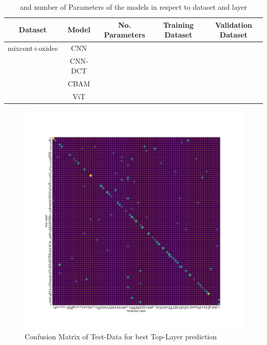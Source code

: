 \begin{table}[H]
    \centering
    \begin{tabular}{c|c|c|c|c}
        Dataset & Model   & No. Parameters & Training Dataset    & Validation Dataset    \\
        \hline
 mixcont+oxides& CNN     &                &                       &                         \\
               & CNN-DCT &                &                       &                         \\
               & CBAM    &                &                       &                         \\
               & ViT     &                &                       &                         \\

    \end{tabular}
    \caption{ and number of Parameters of the models in respect to dataset and layer}
    \label{tab:acc_depth}
\end{table}




\begin{center}
\begin{figure}
        \centerline{\includegraphics[width=1.4\textwidth]{Figures/best_task_1_model_CM.png}}
    \centering
    \caption{Confusion Matrix of Test-Data for best Top-Layer prediction}
    \label{cm_cnn_1l}
\end{figure}
\end{center}